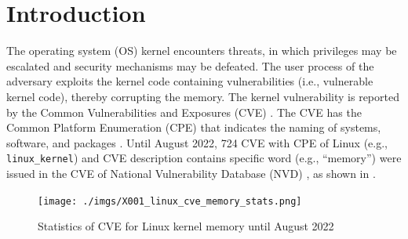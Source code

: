 \section{Introduction}\label{seciton:introduction}
%
The operating system (OS) kernel encounters threats, in which privileges may be
escalated and security mechanisms may be defeated.
The user process of the adversary exploits the kernel code containing
vulnerabilities (i.e., vulnerable kernel code), thereby corrupting the memory.
%
The kernel vulnerability is reported by the Common Vulnerabilities and Exposures
(CVE) \cite{cve}. The CVE has the Common Platform Enumeration (CPE) that indicates the naming of
systems, software, and packages \cite{cpe}.
%
Until August 2022, 724 CVE with CPE of Linux (e.g., \verb|linux_kernel|) and CVE
description contains specific word (e.g., ``memory'') were issued in the CVE of
National Vulnerability Database (NVD) \cite{nvd}, as shown in
.

\begin{figure}[tb]
    \hspace{-5ex}
        \begin{center}
          \texttt{[image: ./imgs/X001\_linux\_cve\_memory\_stats.png]}
        \end{center}
        \caption{
          Statistics of CVE for Linux kernel memory until August 2022 \cite{nvd}
        }
        \label{fig:linux_memory_cve}
\end{figure}

